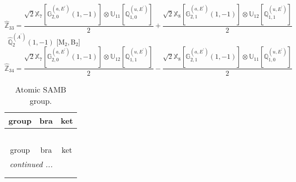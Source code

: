 \documentclass[fleqn,10pt,landscape]{article}
\begin{document}
\begin{itemize}
\begin{dmath*}
\hat{\mathbb{Z}}_{33}=\frac{\sqrt{2} \mathbb{X}_{7}[\mathbb{G}_{2,0}^{(a,E^{\prime})}(1,-1)] \otimes\mathbb{U}_{11}[\mathbb{Q}_{1,0}^{(u,E^{\prime})}]}{2} + \frac{\sqrt{2} \mathbb{X}_{8}[\mathbb{G}_{2,1}^{(a,E^{\prime})}(1,-1)] \otimes\mathbb{U}_{12}[\mathbb{Q}_{1,1}^{(u,E^{\prime})}]}{2}
\end{dmath*}
\vspace{4mm}
\noindent {} $\,\,\,\hat{\mathbb{Q}}_{2}^{(A^{\prime})}(1,-1)$ [M$_{2}$,\,B$_{2}$]
\begin{dmath*}
\hat{\mathbb{Z}}_{34}=\frac{\sqrt{2} \mathbb{X}_{7}[\mathbb{G}_{2,0}^{(a,E^{\prime})}(1,-1)] \otimes\mathbb{U}_{12}[\mathbb{Q}_{1,1}^{(u,E^{\prime})}]}{2} - \frac{\sqrt{2} \mathbb{X}_{8}[\mathbb{G}_{2,1}^{(a,E^{\prime})}(1,-1)] \otimes\mathbb{U}_{11}[\mathbb{Q}_{1,0}^{(u,E^{\prime})}]}{2}
\end{dmath*}
\begin{center}
\renewcommand{\arraystretch}{1.3}
\begin{longtable}{c|c|c}
\caption{Atomic SAMB group.}
 \\
 \hline \hline
group & bra & ket \\ \hline \endfirsthead

\multicolumn{2}{l}{\tablename\ \thetable{}} \\
 \hline \hline
group & bra & ket \\ \hline \endhead

 \hline \hline
\multicolumn{2}{r}{\footnotesize\it continued ...} \\ \endfoot

 \hline \hline
\multicolumn{2}{r}{} \\ \endlastfoot


\end{longtable}
\end{center}
\end{itemize}
\end{document}
